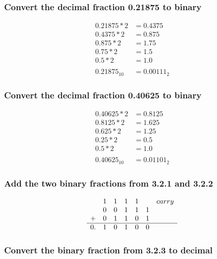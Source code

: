 \documentclass[12pt,a4paper]{article}
\begin{document}
\subsubsection{Convert the decimal fraction 0.21875 to binary}

\begin{align*}
0.21875 * 2 &= 0.4375 \\
0.4375 * 2 &= 0.875 \\
0.875 * 2 &= 1.75 \\
0.75 * 2 &= 1.5 \\
0.5 * 2 &= 1.0 \\
\\
0.21875_{10} &= 0.00111_{2}
\end{align*}

\subsubsection{Convert the decimal fraction 0.40625 to binary}

\begin{align*}
0.40625 * 2 &= 0.8125 \\
0.8125 * 2 &= 1.625 \\
0.625 * 2 &= 1.25 \\
0.25 * 2 &= 0.5 \\
0.5 * 2 &= 1.0 \\
\\
0.40625_{10} &= 0.01101_{2}
\end{align*}

\newpage
\subsubsection{Add the two binary fractions from 3.2.1 and 3.2.2}

\begin{equation*}
\centering
\begin{array}{c c c c c c c}
  & 1 & 1 & 1 & 1 &   & carry \\
  & 0 & 0 & 1 & 1 & 1         \\
+ & 0 & 1 & 1 & 0 & 1         \\ \hline
0.& 1 & 0 & 1 & 0 & 0
\end{array}
\end{equation*}

\subsubsection{Convert the binary fraction from 3.2.3 to decimal}
\end{document}
